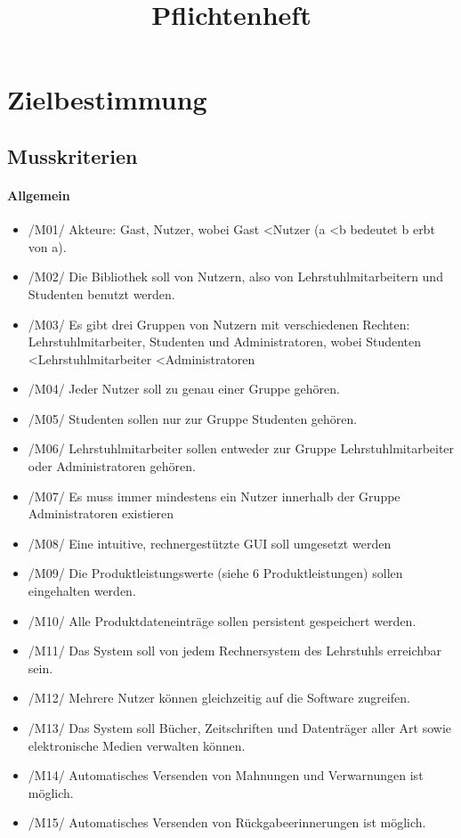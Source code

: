 \documentclass[12pt, a4paper]{article}
\title{Pflichtenheft}
\begin{document}
\maketitle
\pagebreak
\tableofcontents
\pagebreak

\section{Zielbestimmung}
\subsection{Musskriterien}
\paragraph{Allgemein}
\begin{itemize}
	\item /M01/ Akteure: Gast, Nutzer, wobei Gast \textless  Nutzer (a \textless b bedeutet b erbt von a).
	\item /M02/ Die Bibliothek soll von Nutzern, also von Lehrstuhlmitarbeitern und Studenten benutzt werden.
	\item /M03/ Es gibt drei Gruppen von Nutzern mit verschiedenen Rechten: Lehrstuhlmitarbeiter, Studenten und Administratoren, wobei Studenten \textless Lehrstuhlmitarbeiter \textless Administratoren
	\item /M04/ Jeder Nutzer soll zu genau einer Gruppe gehören.
	\item /M05/ Studenten sollen nur zur Gruppe Studenten gehören.
	\item /M06/ Lehrstuhlmitarbeiter sollen entweder zur Gruppe Lehrstuhlmitarbeiter oder Administratoren gehören.
	\item /M07/ Es muss immer mindestens ein Nutzer innerhalb der Gruppe Administratoren existieren
	\item /M08/ Eine intuitive, rechnergestützte GUI soll umgesetzt werden
	\item /M09/ Die Produktleistungswerte (siehe 6 Produktleistungen) sollen eingehalten werden.
	\item /M10/ Alle Produktdateneinträge sollen persistent gespeichert werden.
	\item /M11/ Das System soll von jedem Rechnersystem des Lehrstuhls erreichbar sein.
	\item /M12/ Mehrere Nutzer können gleichzeitig auf die Software zugreifen.
	\item /M13/ Das System soll Bücher, Zeitschriften und Datenträger aller Art sowie elektronische Medien verwalten können.
	\item /M14/ Automatisches Versenden von Mahnungen und Verwarnungen ist möglich.
	\item /M15/ Automatisches Versenden von Rückgabeerinnerungen ist möglich.
\end{itemize}
\end{document}
